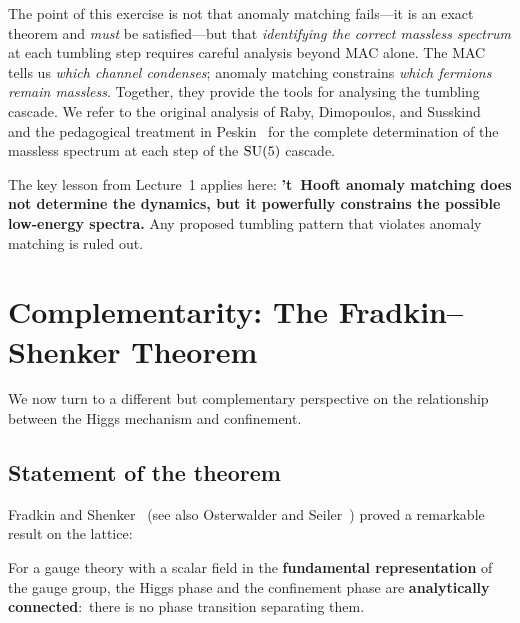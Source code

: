 \documentclass[11pt,a4paper]{article}
\begin{document}
\begin{remark}
  The point of this exercise is not that anomaly matching fails---it
  is an exact theorem and \emph{must} be satisfied---but that
  \emph{identifying the correct massless spectrum} at each tumbling
  step requires careful analysis beyond MAC alone.  The MAC tells us
  \emph{which channel condenses}; anomaly matching constrains
  \emph{which fermions remain massless}.  Together, they provide the
  tools for analysing the tumbling cascade.  We refer to the original
  analysis of Raby, Dimopoulos, and Susskind~\cite{RDS1980} and
  the pedagogical treatment in Peskin~\cite{Peskin1997} for the
  complete determination of the massless spectrum at each step of
  the $\mathrm{SU}(5)$ cascade.

  The key lesson from Lecture~1 applies here: \textbf{'t~Hooft anomaly
  matching does not determine the dynamics, but it powerfully constrains
  the possible low-energy spectra.}  Any proposed tumbling pattern that
  violates anomaly matching is ruled out.
\end{remark}


\section{Complementarity: The Fradkin--Shenker Theorem}
\label{sec:complementarity}

We now turn to a different but complementary perspective on the
relationship between the Higgs mechanism and confinement.

\subsection{Statement of the theorem}

Fradkin and Shenker~\cite{FS1979} (see also Osterwalder and
Seiler~\cite{OS1978}) proved a remarkable result on the lattice:

\begin{theorem}\label{thm:FS}
  For a gauge theory with a scalar field in the \textbf{fundamental
  representation} of the gauge group, the Higgs phase and the
  confinement phase are \textbf{analytically connected}:\ there is no
  phase transition separating them.
\end{theorem}
\end{document}
